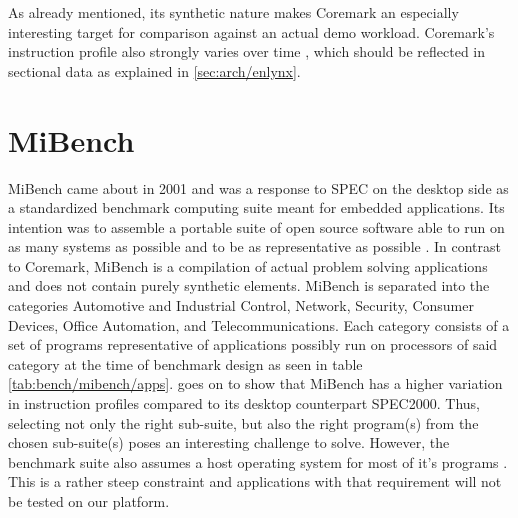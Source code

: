 \documentclass[../bachelor_paper.tex]{subfiles}
\begin{document}
As already mentioned, its synthetic nature makes Coremark an especially interesting target for comparison against an actual demo workload. Coremark's instruction profile also strongly varies over time \cite{gal-onExploringCoremarkBenchmark2012}, which should be reflected in sectional data as explained in \ref{sec:arch/enlynx}.

\section{MiBench}
    \label{sec:bench:mibench}
MiBench came about in 2001 and was a response to \acs{SPEC} on the desktop side as a standardized benchmark computing suite meant for embedded applications. Its intention was to assemble a portable suite of open source software able to run on as many systems as possible and to be as representative as possible \cite{guthausMiBenchFreeCommercially2001}. In contrast to Coremark, MiBench is a compilation of actual problem solving applications and does not contain purely synthetic elements. MiBench is separated into the categories Automotive and
Industrial Control, Network, Security, Consumer Devices, Office Automation, and Telecommunications. Each category consists of a set of programs representative of applications possibly run on processors of said category at the time of benchmark design as seen in table \ref{tab:bench/mibench/apps}. \cite{guthausMiBenchFreeCommercially2001} goes on to show that MiBench has a higher variation in instruction profiles compared to its desktop counterpart \acs{SPEC}2000. Thus, selecting not only the right sub-suite, but also the right program(s) from the chosen sub-suite(s) poses an interesting challenge to solve. However, the benchmark suite also assumes a host operating system for most of it's programs \cite{pallisterBEEBSOpenBenchmarks2013}. This is a rather steep constraint and applications with that requirement will not be tested on our platform. 
\end{document}

